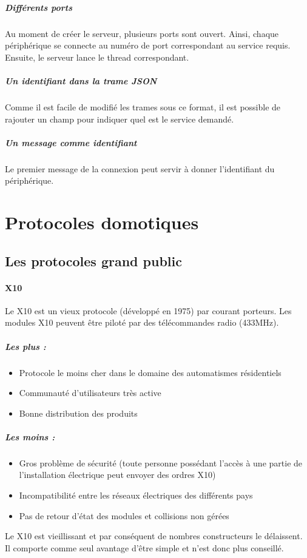 \documentclass[a4paper,10pt]{article}
\begin{document}
\subparagraph{Différents ports} Au moment de créer le serveur, plusieurs ports sont ouvert. Ainsi, chaque périphérique se connecte au numéro de port correspondant au service requis. Ensuite, le serveur lance le thread correspondant.

\subparagraph{Un identifiant dans la trame JSON} Comme il est facile de modifié les trames sous ce format, il est possible de rajouter un champ pour indiquer quel est le service demandé. 

\subparagraph{Un message comme identifiant} Le premier message de la connexion peut servir à donner l'identifiant du périphérique.


\section{Protocoles domotiques}

\subsection{Les protocoles grand public}
\paragraph{X10}
Le X10 est un vieux protocole (développé en 1975) par courant porteurs.  Les modules X10 peuvent être piloté par des télécommandes radio (433MHz). 

\subparagraph{Les plus :}
\begin{itemize}
\item Protocole le moins cher dans le domaine des automatismes résidentiels
\item Communauté d'utilisateurs très active
\item Bonne distribution des produits
\end{itemize}
\subparagraph{Les moins :}
\begin{itemize}
\item Gros problème de sécurité (toute personne possédant l'accès à une partie de l'installation électrique peut envoyer des ordres X10)
\item Incompatibilité entre les réseaux électriques des différents pays
\item Pas de retour d'état des modules et collisions non gérées
\end{itemize}
Le X10 est vieillissant et par conséquent de nombres constructeurs le délaissent. Il comporte comme seul avantage d'être simple et n'est donc plus conseillé.
\end{document}
